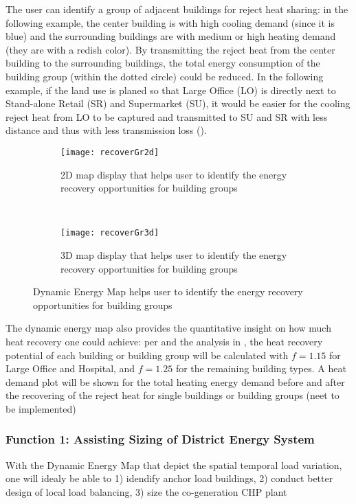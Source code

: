 The user can identify a group of adjacent buildings for reject heat
sharing: in the following example, the center building is with high
cooling demand (since it is blue) and the surrounding buildings are
with medium or high heating demand (they are with a redish color). By
transmitting the reject heat from the center building to the
surrounding buildings, the total energy consumption of the building
group (within the dotted circle) could be reduced. In the following
example, if the land use is planed so that Large Office (LO) is
directly next to Stand-alone Retail (SR) and Supermarket (SU), it
would be easier for the cooling reject heat from LO to be captured and
transmitted to SU and SR with less distance and thus with less
transmission loss ().

\begin{figure}[h!]
  \centering
  \begin{subfigure}{0.7\textwidth}
  \centering
  \texttt{[image: recoverGr2d]}
  \caption[Energy Recovery Building Group, 2D]{2D map display that
    helps user to identify the energy recovery opportunities for
    building groups}
  \label{fig:recoverGr2d}
\end{subfigure}
~
\begin{subfigure}{0.7\textwidth}
  \centering
  \texttt{[image: recoverGr3d]}
  \caption[Energy Recovery Building Group, 3D]{3D map display that
    helps user to identify the energy recovery opportunities for
    building groups}
  \label{fig:recoverGr3d}
\end{subfigure}
\caption[Building Group Energy Recovery]{Dynamic Energy Map helps user
  to identify the energy recovery opportunities for building groups}
\label{fig:recoverGr}
\end{figure}

The dynamic energy map also provides the quantitative insight on how
much heat recovery one could achieve: per  and the
analysis in , the heat recovery potential of
each building or building group will be calculated with $f = 1.15$ for
Large Office and Hospital, and $f = 1.25$ for the remaining building
types. A heat demand plot will be shown for the total heating energy
demand before and after the recovering of the reject heat for single
buildings or building groups (neet to be implemented)

\subsubsection{Function 1: Assisting Sizing of District Energy System}
With the Dynamic Energy Map that depict the spatial temporal load
variation, one will idealy be able to 1) idendify anchor load
buildings, 2) conduct better design of local load balancing, 3) size
the co-generation CHP plant

